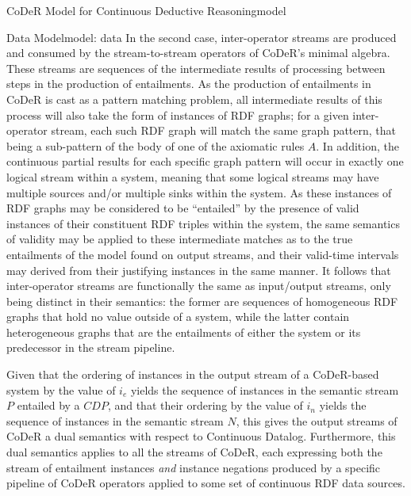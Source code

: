 \begin{nestedsection}{CoDeR Model for Continuous Deductive Reasoning}{model}
\begin{nestedsection}{Data Model}{model: data}
		In the second case, inter-operator streams are produced and consumed by the stream-to-stream operators of CoDeR's minimal algebra.
		These streams are sequences of the intermediate results of processing between steps in the production of entailments.
		As the production of entailments in CoDeR is cast as a pattern matching problem, all intermediate results of this process will also take the form of instances of RDF graphs;
		for a given inter-operator stream, each such RDF graph will match the same graph pattern, that being a sub-pattern of the body of one of the axiomatic rules $A$.
		In addition, the continuous partial results for each specific graph pattern will occur in exactly one logical stream within a system, meaning that some logical streams may have multiple sources and/or multiple sinks within the system.
		As these instances of RDF graphs may be considered to be ``entailed'' by the presence of valid instances of their constituent RDF triples within the system, the same semantics of validity may be applied to these intermediate matches as to the true entailments of the model found on output streams, and their valid-time intervals may derived from their justifying instances in the same manner.
		It follows that inter-operator streams are functionally the same as input/output streams, only being distinct in their semantics:
		the former are sequences of homogeneous RDF graphs that hold no value outside of a system, while the latter contain heterogeneous graphs that are the entailments of either the system or its predecessor in the stream pipeline.

		Given that the ordering of instances in the output stream of a CoDeR-based system by the value of $i_{e}$ yields the sequence of instances in the semantic stream $P$ entailed by a ${CDP}$, and that their ordering by the value of $i_{n}$ yields the sequence of instances in the semantic stream $N$, this gives the output streams of CoDeR a dual semantics with respect to Continuous Datalog.
		Furthermore, this dual semantics applies to all the streams of CoDeR, each expressing both the stream of entailment instances \emph{and} instance negations produced by a specific pipeline of CoDeR operators applied to some set of continuous RDF data sources.
	\end{nestedsection}


\end{nestedsection}
